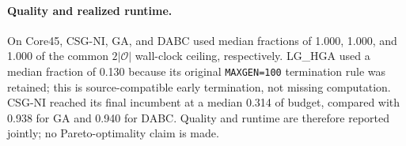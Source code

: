 \paragraph{Quality and realized runtime.} On Core45, CSG-NI, GA, and DABC used median fractions of 1.000, 1.000, and 1.000 of the common $2|\mathcal{O}|$ wall-clock ceiling, respectively. LG\_HGA used a median fraction of 0.130 because its original \texttt{MAXGEN=100} termination rule was retained; this is source-compatible early termination, not missing computation. CSG-NI reached its final incumbent at a median 0.314 of budget, compared with 0.938 for GA and 0.940 for DABC. Quality and runtime are therefore reported jointly; no Pareto-optimality claim is made.
